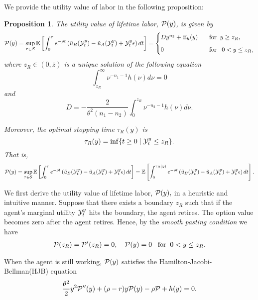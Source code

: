 \documentclass[a4paper,report, 11pt]{article}
\newtheorem{pro}{Proposition}[section]
\def\e{\epsilon}
\def\t{\theta}
\def\be{\begin{eqnarray}}
\def\ee{\end{eqnarray}}
\begin{document}
We provide the utility value of labor in the following proposition: 
\begin{pro}\label{pro:OS}
The utility value of lifetime labor,	${\cal P}(y)$,  is given by 
		\begin{eqnarray}\label{eq:P-closed}
		\begin{split}
		{\cal P}(y)=\sup_{\tau \in {\cal S}} \mathbb{E}\left[\int_0^\tau e^{-\rho t}\left(\tilde{u}_B({\cal Y}_t^y )-\tilde{u}_A({\cal Y}_t^y)+{\cal Y}_t^y \e\right)dt\right]=
		\begin{cases}
		Dy^{n_2}+\Xi_h(y)\;\;\;&\mbox{for}\;\;y\ge z_R,\vspace{2mm}\\
		0\;\;\;&\mbox{for}\;\;\;0<y\le z_R,
		\end{cases}
		\end{split}
		\end{eqnarray}
where $z_R\in(0,\bar{z})$ is a unique solution of the following equation
\begin{equation*}
\int_{z_R}^\infty \nu^{-n_1-1}{h}(\nu)d\nu =0
\end{equation*}
and
\begin{equation*}
D=-\dfrac{2}{\t^2(n_1-n_2)}\int_0^{z_R}\nu^{-n_2-1}{h}(\nu)d\nu. 
\end{equation*}



Moreover, the optimal stopping time $\tau_R(y)$ is 
$$
\tau_R(y)=\inf\{t\ge 0 \mid {\cal Y}_t^y \le z_R \}.
$$
That is, 
\begin{equation*}
{\cal P}(y)=\sup_{\tau \in {\cal S}} \mathbb{E}\left[\int_0^\tau e^{-\rho t}\left(\tilde{u}_B({\cal Y}_t^y )-\tilde{u}_A({\cal Y}_t^y)+{\cal Y}_t^y \e\right)dt\right]=\mathbb{E}\left[\int_0^{\tau_R(y)} e^{-\rho t}\left(\tilde{u}_B({\cal Y}_t^y )-\tilde{u}_A({\cal Y}_t^y)+{\cal Y}_t^y \e\right)dt\right].
\end{equation*}
\end{pro}


We first derive the utility value of lifetime labor, ${\cal P}(y),$ in a heuristic and intuitive manner.  Suppose that there exists a boundary $z_R$ such that if the agent's marginal utility ${\cal Y}_t^y$ hits the boundary, the agent retires. The option value becomes zero after the agent retires. Hence, by the \textit{smooth pasting condition} we have 
	\be\label{boundary_condition}
	{\cal P}(z_R) = {\cal P}'(z_R)=0, \quad {\cal P}(y) = 0 \;\;\;\mbox{for}\;\; 0<y\le z_R.
	\ee
	
	When the agent is still working, ${\cal P}(y)$ satisfies  the Hamilton-Jacobi-Bellman(HJB) equation
	\be\label{eq:HJB}
	\dfrac{\t^2}{2}y^2{\cal P}''(y) + (\rho-r)y{\cal P}(y) - \rho {\cal P} + {h}(y)=0.
	\ee
	
\end{document}
